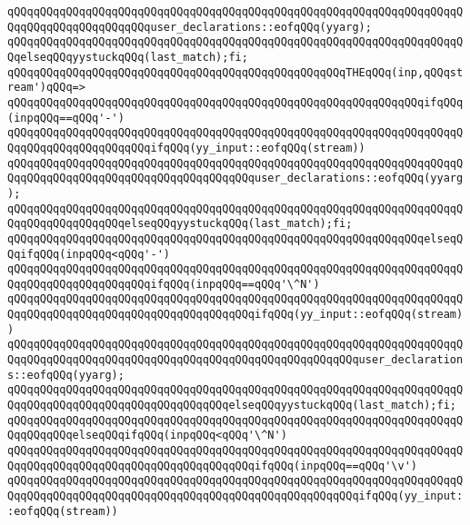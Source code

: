\verb|qQQqqQQqqQQqqQQqqQQqqQQqqQQqqQQqqQQqqQQqqQQqqQQqqQQqqQQqqQQqqQQqqQQqqQQqqQQqqQQqqQQqqQQqqQQquser_declarations::eofqQQq(yyarg);|\newline
\verb|qQQqqQQqqQQqqQQqqQQqqQQqqQQqqQQqqQQqqQQqqQQqqQQqqQQqqQQqqQQqqQQqqQQqqQQqelseqQQqyystuckqQQq(last_match);fi;|\newline
\verb|qQQqqQQqqQQqqQQqqQQqqQQqqQQqqQQqqQQqqQQqqQQqqQQqqQQqTHEqQQq(inp,qQQqstream')qQQq=>|\newline
\verb|qQQqqQQqqQQqqQQqqQQqqQQqqQQqqQQqqQQqqQQqqQQqqQQqqQQqqQQqqQQqqQQqifqQQq(inpqQQq==qQQq'-')|\newline
\verb|qQQqqQQqqQQqqQQqqQQqqQQqqQQqqQQqqQQqqQQqqQQqqQQqqQQqqQQqqQQqqQQqqQQqqQQqqQQqqQQqqQQqqQQqqQQqifqQQq(yy_input::eofqQQq(stream))|\newline
\verb|qQQqqQQqqQQqqQQqqQQqqQQqqQQqqQQqqQQqqQQqqQQqqQQqqQQqqQQqqQQqqQQqqQQqqQQqqQQqqQQqqQQqqQQqqQQqqQQqqQQqqQQqqQQquser_declarations::eofqQQq(yyarg);|\newline
\verb|qQQqqQQqqQQqqQQqqQQqqQQqqQQqqQQqqQQqqQQqqQQqqQQqqQQqqQQqqQQqqQQqqQQqqQQqqQQqqQQqqQQqqQQqelseqQQqyystuckqQQq(last_match);fi;|\newline
\verb|qQQqqQQqqQQqqQQqqQQqqQQqqQQqqQQqqQQqqQQqqQQqqQQqqQQqqQQqqQQqqQQqelseqQQqifqQQq(inpqQQq<qQQq'-')|\newline
\verb|qQQqqQQqqQQqqQQqqQQqqQQqqQQqqQQqqQQqqQQqqQQqqQQqqQQqqQQqqQQqqQQqqQQqqQQqqQQqqQQqqQQqqQQqqQQqifqQQq(inpqQQq==qQQq'\^N')|\newline
\verb|qQQqqQQqqQQqqQQqqQQqqQQqqQQqqQQqqQQqqQQqqQQqqQQqqQQqqQQqqQQqqQQqqQQqqQQqqQQqqQQqqQQqqQQqqQQqqQQqqQQqqQQqqQQqifqQQq(yy_input::eofqQQq(stream))|\newline
\verb|qQQqqQQqqQQqqQQqqQQqqQQqqQQqqQQqqQQqqQQqqQQqqQQqqQQqqQQqqQQqqQQqqQQqqQQqqQQqqQQqqQQqqQQqqQQqqQQqqQQqqQQqqQQqqQQqqQQqqQQqqQQquser_declarations::eofqQQq(yyarg);|\newline
\verb|qQQqqQQqqQQqqQQqqQQqqQQqqQQqqQQqqQQqqQQqqQQqqQQqqQQqqQQqqQQqqQQqqQQqqQQqqQQqqQQqqQQqqQQqqQQqqQQqqQQqqQQqelseqQQqyystuckqQQq(last_match);fi;|\newline
\verb|qQQqqQQqqQQqqQQqqQQqqQQqqQQqqQQqqQQqqQQqqQQqqQQqqQQqqQQqqQQqqQQqqQQqqQQqqQQqqQQqelseqQQqifqQQq(inpqQQq<qQQq'\^N')|\newline
\verb|qQQqqQQqqQQqqQQqqQQqqQQqqQQqqQQqqQQqqQQqqQQqqQQqqQQqqQQqqQQqqQQqqQQqqQQqqQQqqQQqqQQqqQQqqQQqqQQqqQQqqQQqqQQqifqQQq(inpqQQq==qQQq'\v')|\newline
\verb|qQQqqQQqqQQqqQQqqQQqqQQqqQQqqQQqqQQqqQQqqQQqqQQqqQQqqQQqqQQqqQQqqQQqqQQqqQQqqQQqqQQqqQQqqQQqqQQqqQQqqQQqqQQqqQQqqQQqqQQqqQQqifqQQq(yy_input::eofqQQq(stream))|\newline
